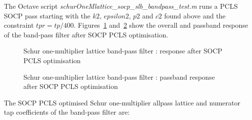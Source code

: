 \documentclass[a4paper,twoside,10pt,english]{report}
\begin{document}
The Octave script \emph{schurOneMlattice\_socp\_slb\_bandpass\_test.m} runs a
PCLS SOCP pass starting with the $k2$, $epsilon2$, $p2$ and $c2$ found above
and the constraint $tpr=tp/400$.
Figures~\ref{fig:Schur-one-multiplier-lattice-band-pass-filter-SOCP-PCLS} 
and~\ref{fig:Schur-one-multiplier-lattice-band-pass-filter-SOCP-PCLS-pass} 
show the overall and passband response of the band-pass filter after SOCP PCLS
optimisation.

\begin{figure}[!htbp]
\begin{center}
\scalebox{0.7}{}
\caption{Schur one-multiplier lattice band-pass filter : response after SOCP PCLS optimisation}
\label{fig:Schur-one-multiplier-lattice-band-pass-filter-SOCP-PCLS}
\end{center}
\end{figure}
\begin{figure}[!htbp]
\begin{center}
\scalebox{0.7}{}
\caption{Schur one-multiplier lattice band-pass filter : passband response after SOCP PCLS optimisation}
\label{fig:Schur-one-multiplier-lattice-band-pass-filter-SOCP-PCLS-pass}
\end{center}
\end{figure}

The SOCP PCLS optimised Schur one-multiplier
allpass lattice and numerator tap coefficients of the band-pass filter are:
\begin{small}




\end{small}
\clearpage
\end{document}
